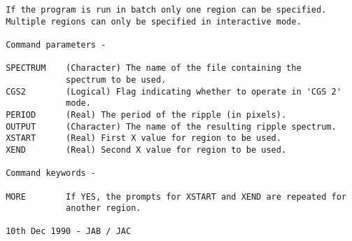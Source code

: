 \begin{description}
\begin{verbatim}
 If the program is run in batch only one region can be specified.
 Multiple regions can only be specified in interactive mode.

 Command parameters -

 SPECTRUM    (Character) The name of the file containing the
             spectrum to be used.
 CGS2        (Logical) Flag indicating whether to operate in 'CGS 2'
             mode.
 PERIOD      (Real) The period of the ripple (in pixels).
 OUTPUT      (Character) The name of the resulting ripple spectrum.
 XSTART      (Real) First X value for region to be used.
 XEND        (Real) Second X value for region to be used.

 Command keywords -

 MORE        If YES, the prompts for XSTART and XEND are repeated for
             another region.

 10th Dec 1990 - JAB / JAC
\end{verbatim}
\end{description}
